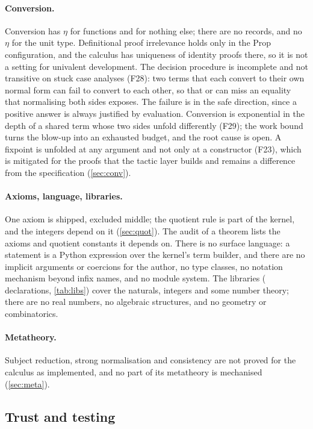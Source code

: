 \paragraph{Conversion.}
Conversion has $\eta$ for functions and for nothing else; there are no records, and no $\eta$ for the unit type.
Definitional proof irrelevance holds only in the Prop configuration, and the calculus has uniqueness of identity proofs there, so it is not a setting for univalent development.
The decision procedure is incomplete and not transitive on stuck case analyses (F28): two terms that each convert to their own normal form can fail to convert to each other, so that  or  can miss an equality that normalising both sides exposes.
The failure is in the safe direction, since a positive answer is always justified by evaluation.
Conversion is exponential in the depth of a shared term whose two sides unfold differently (F29); the work bound turns the blow-up into an exhausted budget, and the root cause is open.
A fixpoint is unfolded at any argument and not only at a constructor (F23), which is mitigated for the proofs that the tactic layer builds and remains a difference from the specification (\cref{sec:conv}).

\paragraph{Axioms, language, libraries.}
One axiom is shipped, excluded middle; the quotient rule is part of the kernel, and the integers depend on it (\cref{sec:quot}).
The audit of a theorem lists the axioms and quotient constants it depends on.
There is no surface language: a statement is a Python expression over the kernel's term builder, and there are no implicit arguments or coercions for the author, no type classes, no notation mechanism beyond infix names, and no module system.
The libraries (\libGlobals{} declarations, \cref{tab:libs}) cover the naturals, integers and some number theory; there are no real numbers, no algebraic structures, and no geometry or combinatorics.

\paragraph{Metatheory.}
Subject reduction, strong normalisation and consistency are not proved for the calculus as implemented, and no part of its metatheory is mechanised (\cref{sec:meta}).

\subsection{Trust and testing}

